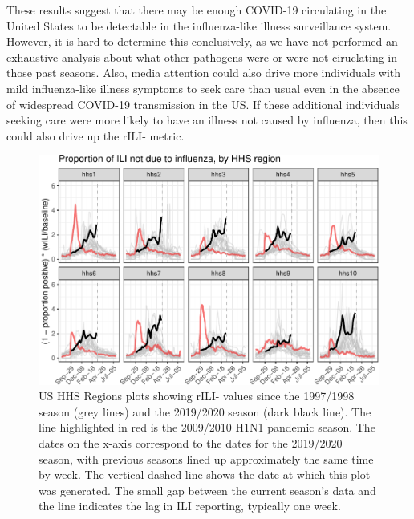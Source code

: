 \documentclass[]{article}
\begin{document}
These results suggest that there may be enough COVID-19 circulating in
the United States to be detectable in the influenza-like illness
surveillance system. However, it is hard to determine this conclusively,
as we have not performed an exhaustive analysis about what other
pathogens were or were not ciruclating in those past seasons. Also,
media attention could also drive more individuals with mild
influenza-like illness symptoms to seek care than usual even in the
absence of widespread COVID-19 transmission in the US. If these
additional individuals seeking care were more likely to have an illness
not caused by influenza, then this could also drive up the rILI- metric.

\begin{figure}
\centering
\includegraphics{ili-labtest-report_files/figure-latex/all-region-plot-ILI-1.pdf}
\caption{\label{fig:all-region-plot}US HHS Regions plots showing rILI-
values since the 1997/1998 season (grey lines) and the 2019/2020 season
(dark black line). The line highlighted in red is the 2009/2010 H1N1
pandemic season. The dates on the x-axis correspond to the dates for the
2019/2020 season, with previous seasons lined up approximately the same
time by week. The vertical dashed line shows the date at which this plot
was generated. The small gap between the current season's data and the
line indicates the lag in ILI reporting, typically one week.}
\end{figure}
\end{document}
